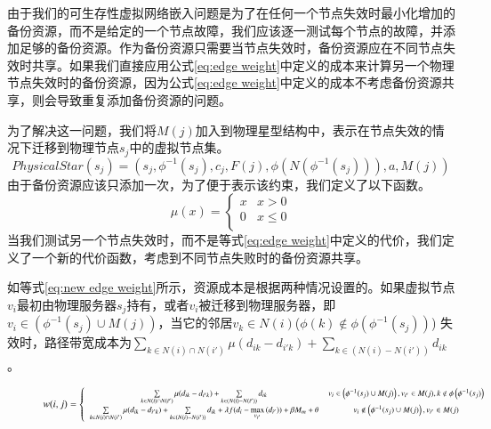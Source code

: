 由于我们的可生存性虚拟网络嵌入问题是为了在任何一个节点失效时最小化增加的备份资源，而不是给定的一个节点故障，我们应该逐一测试每个节点的故障，并添加足够的备份资源。作为备份资源只需要当节点失效时，备份资源应在不同节点失效时共享。如果我们直接应用公式\ref{eq:edge weight}中定义的成本来计算另一个物理节点失效时的备份资源，因为公式\ref{eq:edge weight}中定义的成本不考虑备份资源共享，则会导致重复添加备份资源的问题。

为了解决这一问题，我们将$M(j)$加入到物理星型结构中，表示在节点失效的情况下迁移到物理节点$s_j$中的虚拟节点集。
\begin{equation}
PhysicalStar(s_j)=(s_j, \phi^{-1}( s_j), c_j, F(j), \phi(N(\phi^{-1}( s_j))), a, M(j))
\end{equation}
由于备份资源应该只添加一次，为了便于表示该约束，我们定义了以下函数。
\begin{equation}
\mu (x) = \left\{ {\begin{array}{*{20}{c}}
   x & {x > 0}  \\
   0 & {x \le 0}  \\
\end{array}} \right.
\end{equation}
当我们测试另一个节点失效时，而不是等式\ref{eq:edge weight}中定义的代价，我们定义了一个新的代价函数，考虑到不同节点失败时的备份资源共享。

如等式\ref{eq:new edge weight}所示，资源成本是根据两种情况设置的。如果虚拟节点$v_i$最初由物理服务器$s_j$持有，或者$v_i$被迁移到物理服务器，即${{v_i} \in \left( {{\phi ^{ - 1}}({s_j}) \cup M(j)} \right)}$，当它的邻居$v_k \in N(i)$(${\phi \left( k \right) \notin \phi \left( {{\phi ^{ - 1}}({s_j})} \right)}$) 失效时，路径带宽成本为${\sum\limits_{k \in N(i) \cap N(i')} {\mu({d_{ik}} - {d_{i'k}})}  + \sum\limits_{k \in \left( {N(i) - N(i')} \right)} {{d_{ik}}} }$。

\begin{figure}
  \centering
    \begin{equation}
  \footnotesize
w(i,j) = \left\{ {\begin{array}{*{20}{c}}
   {\sum\limits_{k \in N(i) \cap N(i')} {\mu({d_{ik}} - {d_{i'k}})}  + \sum\limits_{k \in \left( {N(i) - N(i')} \right)} {{d_{ik}}} } & {{v_i} \in \left( {{\phi ^{ - 1}}({s_j}) \cup M(j)} \right),{v_{i'}} \in M(j),k \notin \phi \left( {{\phi ^{ - 1}}({s_j})} \right)}  \\
   {\sum\limits_{k \in N(i) \cap N(i')} {\mu({d_{ik}} - {d_{i'k}})}  + \sum\limits_{k \in \left( {N(i) - N(i')} \right)} {{d_{ik}}}  + \lambda f({d_i} - \mathop {\max }\limits_{{v_{i'}}} \left( {{d_{i'}}} \right)) + \beta {M_m} + \theta } & {{v_i} \notin \left( {{\phi ^{ - 1}}({s_j}) \cup M(j)} \right),{v_{i'}} \in M(j)}  \\
\end{array}} \right.
    \label{eq:new edge weight}
    \end{equation}
\end{figure}

